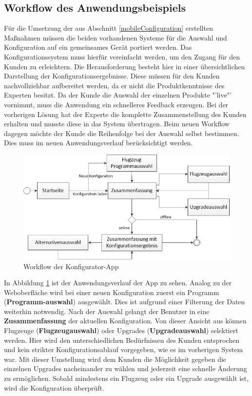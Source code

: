 \subsection{Workflow des Anwendungsbeispiels}\label{workflowNew}
Für die Umsetzung der aus Abschnitt \ref{mobileConfiguration} erstellten Maßnahmen müssen die beiden vorhandenen Systeme für die Auswahl und Konfiguration auf ein gemeinsames Gerät portiert werden. Das Konfigurationssystem muss hierfür vereinfacht werden, um den Zugang für den Kunden zu erleichtern. Die Herausforderung besteht hier in einer übersichtlichen Darstellung der Konfigurationsergebnisse. Diese müssen für den Kunden nachvollziehbar aufbereitet werden, da er nicht die Produktkenntnisse des Experten besitzt. Da der Kunde die Auswahl der einzelnen Produkte "'live"' vornimmt, muss die Anwendung ein schnelleres Feedback erzeugen. Bei der vorherigen Lösung hat der Experte die komplette Zusammenstellung des Kunden erhalten und musste diese in das System übertragen. Beim neuen Workflow dagegen möchte der Kunde die Reihenfolge bei der Auswahl selbst bestimmen. Dies muss im neuen Anwendungsverlauf berücksichtigt werden. \par 
\begin{figure}
\centering
\includegraphics[width=\hsize]{images/workflow_app}
\caption{Workflow der Konfigurator-App}
\label{appWorkflow}
\end{figure}
In Abbildung \ref{appWorkflow} ist der Anwendungsverlauf der App zu sehen. Analog zu der Weboberfläche wird bei einer neuen Konfiguration zuerst ein Programm (\textbf{Programm-auswahl}) ausgewählt. Dies ist aufgrund einer Filterung der Daten weiterhin notwendig. Nach der Auswahl gelangt der Benutzer in eine \textbf{Zusammenfassung} der aktuellen Konfiguration. Von dieser Ansicht aus können Flugzeuge (\textbf{Flugzeugauswahl}) oder  Upgrades (\textbf{Upgradeauswahl}) selektiert werden. Hier wird den unterschiedlichen Bedürfnissen des Kunden entsprochen und kein strikter Konfigurationsablauf vorgegeben, wie es im vorherigen System war. Mit dieser Umstellung wird dem Kunden die Möglichkeit gegeben die einzelnen Upgrades nacheinander zu wählen und jederzeit eine schnelle Änderung zu ermöglichen. Sobald mindestens ein Flugzeug oder ein Upgrade ausgewählt ist, wird die Konfiguration überprüft. 
